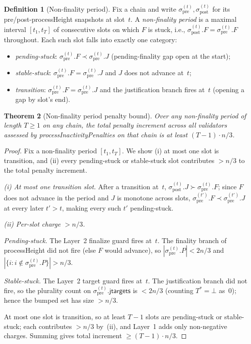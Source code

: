\ifx\litemode\undefined\documentclass{article}\fi
\newcommand{\jtargets}{\mathsf{jtargets}}
\newcommand{\processHeight}{\textsf{processHeight}\xspace}
\newcommand{\processInactivityPenalties}{\textsf{processInactivityPenalties}\xspace}
\theoremstyle{plain}
\newtheorem{theorem}{Theorem}
\theoremstyle{definition}
\newtheorem{definition}[theorem]{Definition}
\theoremstyle{remark}
\begin{document}
\begin{definition}[Non-finality period]\label{def:non-finality-period}
Fix a chain and write $\sigma_{\mathrm{pre}}^{(t)}, \sigma_{\mathrm{post}}^{(t)}$ for its pre/post-\processHeight snapshots at slot~$t$.
A \emph{non-finality period} is a maximal interval $[t_1, t_T]$ of consecutive slots on which $F$ is stuck, i.e., $\sigma_{\mathrm{post}}^{(t)}.F = \sigma_{\mathrm{pre}}^{(t)}.F$ throughout.
Each such slot falls into exactly one category:
\begin{itemize}
  \item \emph{pending-stuck}: $\sigma_{\mathrm{pre}}^{(t)}.F \prec \sigma_{\mathrm{pre}}^{(t)}.J$ (pending-finality gap open at the start);
  \item \emph{stable-stuck}: $\sigma_{\mathrm{pre}}^{(t)}.F = \sigma_{\mathrm{pre}}^{(t)}.J$ and $J$ does not advance at~$t$;
  \item \emph{transition}: $\sigma_{\mathrm{pre}}^{(t)}.F = \sigma_{\mathrm{pre}}^{(t)}.J$ and the justification branch fires at~$t$ (opening a gap by slot's end).
\end{itemize}
\end{definition}

\begin{theorem}[Non-finality period penalty bound]\label{thm:tightness}
Over any non-finality period of length $T \geq 1$ on any chain, the total penalty increment across all validators assessed by \processInactivityPenalties on that chain is at least $(T - 1) \cdot n/3$.
\end{theorem}

\begin{proof}
Fix a non-finality period $[t_1, t_T]$.
We show (i) at most one slot is transition, and (ii) every pending-stuck or stable-stuck slot contributes $> n/3$ to the total penalty increment.

\emph{(i) At most one transition slot.}
After a transition at~$t$, $\sigma_{\mathrm{post}}^{(t)}.J \succ \sigma_{\mathrm{pre}}^{(t)}.F$; since $F$ does not advance in the period and $J$ is monotone across slots, $\sigma_{\mathrm{pre}}^{(t')}.F \prec \sigma_{\mathrm{pre}}^{(t')}.J$ at every later $t' > t$, making every such $t'$ pending-stuck.

\emph{(ii) Per-slot charge $> n/3$.}

\emph{Pending-stuck.} The Layer~2 finalize guard fires at~$t$.
The finality branch of \processHeight did not fire (else $F$ would advance), so $|\sigma_{\mathrm{pre}}^{(t)}.P| < 2n/3$ and $|\{i : i \notin \sigma_{\mathrm{pre}}^{(t)}.P\}| > n/3$.

\emph{Stable-stuck.} The Layer~2 target guard fires at~$t$.
The justification branch did not fire, so the plurality count on $\sigma_{\mathrm{pre}}^{(t)}.\jtargets$ is $< 2n/3$ (counting $T^* = \bot$ as~$0$); hence the bumped set has size $> n/3$.

At most one slot is transition, so at least $T - 1$ slots are pending-stuck or stable-stuck; each contributes $> n/3$ by~(ii), and Layer~1 adds only non-negative charges.
Summing gives total increment $\geq (T-1) \cdot n/3$.
\end{proof}
\end{document}
